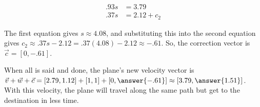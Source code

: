 \documentclass{ximera}
\begin{document}
\begin{problem}
\begin{solution}
  \begin{align*}
    .93s&=3.79\\
    .37s&=2.12+c_2
  \end{align*}

  The first equation gives $s\approx 4.08$, and substituting this into the second equation gives $c_2\approx .37s-2.12=.37(4.08)-2.12\approx -.61$. So, the correction vector is $\vec{c}=[0,-.61]$.

  \end{solution}

  When all is said and done, the plane's new velocity vector is $\vec{v}+\vec{w}+\vec{c}=[2.79, 1.12]+[1,1]+[0,\answer{-.61}]\approx [3.79,\answer{1.51}]$. With this velocity, the plane will travel along the same path but get to the destination in less time.
  

\end{problem}
\end{document}
